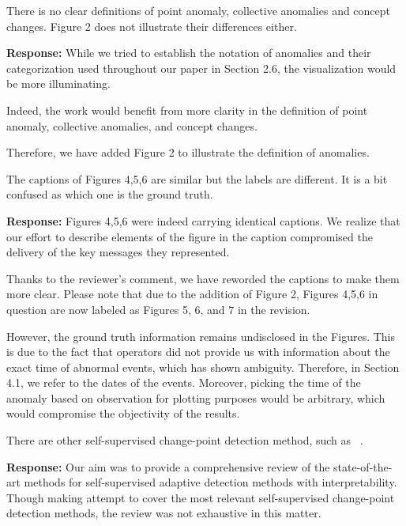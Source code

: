 \documentclass{article}
\makeatletter
\newenvironment{comment}{
\begin{sloppypar}\slshape
\vspace{5 mm}
\color{blue}
 \@beginparpenalty\@M
  \begin{list}{}{\setlength{\topsep}{0ex}%
  \setlength{\leftmargin}{\rightmargin}}\item[]
 \@beginparpenalty\@endparpenalty
}
{\end{list}
\end{sloppypar}
}
\makeatother
\begin{document}
\begin{enumerate}

  \item
        \begin{comment}
        There is no clear definitions of point anomaly, collective anomalies and concept changes. Figure 2 does not illustrate their differences either.
        \end{comment}
        {\bf Response:}
        While we tried to establish the notation of anomalies and their categorization used throughout our paper in Section 2.6, the visualization would be more illuminating.

        Indeed, the work would benefit from more clarity in the definition of point anomaly, collective anomalies, and concept changes.

        Therefore, we have added Figure 2 to illustrate the definition of anomalies.

  \item
        \begin{comment}
        The captions of Figures 4,5,6 are similar but the labels are different. It is a bit confused as which one is the ground truth.
        \end{comment}
        {\bf Response:}
        Figures 4,5,6 were indeed carrying identical captions. We realize that our effort to describe elements of the figure in the caption compromised the delivery of the key messages they represented.

        Thanks to the reviewer's comment, we have reworded the captions to make them more clear. Please note that due to the addition of Figure 2, Figures 4,5,6 in question are now labeled as Figures 5, 6, and 7 in the revision.

        However, the ground truth information remains undisclosed in the Figures. This is due to the fact that operators did not provide us with information about the exact time of abnormal events, which has shown ambiguity. Therefore, in Section 4.1, we refer to the dates of the events. Moreover, picking the time of the anomaly based on observation for plotting purposes would be arbitrary, which would compromise the objectivity of the results.

  \item
        \begin{comment}
        There are other self-supervised change-point detection method, such as ~\cite{Deldari2021}.
        \end{comment}
        {\bf Response:}
        Our aim was to provide a comprehensive review of the state-of-the-art methods for self-supervised adaptive detection methods with interpretability. Though making attempt to cover the most relevant self-supervised change-point detection methods, the review was not exhaustive in this matter.


\end{enumerate}
\end{document}
